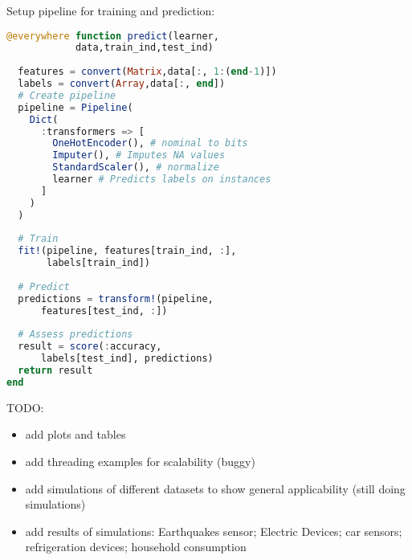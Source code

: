 \documentclass{juliacon}
\begin{document}
Setup pipeline for training and prediction:
\begin{lstlisting}[language = Julia]
@everywhere function predict(learner,
            data,train_ind,test_ind)
            
  features = convert(Matrix,data[:, 1:(end-1)])
  labels = convert(Array,data[:, end])
  # Create pipeline
  pipeline = Pipeline(
    Dict(
      :transformers => [
        OneHotEncoder(), # nominal to bits
        Imputer(), # Imputes NA values
        StandardScaler(), # normalize
        learner # Predicts labels on instances
      ]
    )
  )
  
  # Train
  fit!(pipeline, features[train_ind, :],
       labels[train_ind])
       
  # Predict
  predictions = transform!(pipeline, 
      features[test_ind, :])
  
  # Assess predictions
  result = score(:accuracy, 
      labels[test_ind], predictions)
  return result
end
\end{lstlisting}


TODO: 
\begin{itemize}
\item add plots and tables
\item add threading examples for scalability (buggy)
\item add simulations of different datasets to show general applicability (still doing simulations)
\item add results of simulations: Earthquakes sensor; Electric Devices; car sensors; refrigeration devices; household consumption
\end{itemize}

%
%


\end{document}
